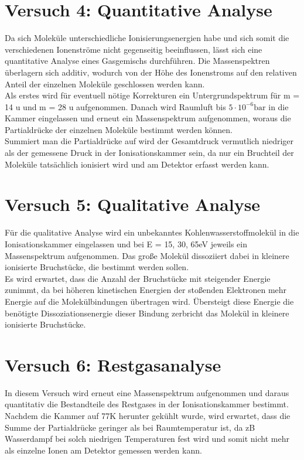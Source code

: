 \section{Versuch 4: Quantitative Analyse}

Da sich Moleküle unterschiedliche Ionisierungsenergien habe und sich somit die verschiedenen Ionenströme nicht gegenseitig beeinflussen, lässt sich eine 
quantitative Analyse eines Gasgemischs durchführen. Die Massenspektren überlagern
sich additiv, wodurch von der Höhe des Ionenstroms auf den relativen Anteil der einzelnen Moleküle geschlossen werden kann.\\
Als erstes wird für eventuell nötige Korrekturen ein Untergrundspektrum für m = 14 u und m = 28 u aufgenommen.
Danach wird Raumluft bis $5\cdot10^{-6} \si{\bar}$ in die Kammer eingelassen und erneut ein Massenspektrum aufgenommen, woraus die Partialdrücke der einzelnen Moleküle bestimmt werden können.\\
Summiert man die Partialdrücke auf wird der Gesamtdruck vermutlich niedriger als der gemessene Druck in der Ionisationskammer sein, da nur ein Bruchteil der Moleküle tatsächlich ionisiert wird und am Detektor erfasst werden kann.

\section{Versuch 5: Qualitative Analyse}

Für die qualitative Analyse wird ein unbekanntes Kohlenwasserstoffmolekül in die Ionisationskammer eingelassen und bei E = {15, 30, 65}\;eV jeweils ein Massenspektrum aufgenommen.
Das große Molekül dissoziiert dabei in kleinere ionisierte Bruchstücke, die bestimmt werden sollen.\\
Es wird erwartet, dass die Anzahl der Bruchstücke mit steigender Energie zunimmt, da bei höheren kinetischen Energien der stoßenden Elektronen mehr Energie auf die Molekülbindungen übertragen wird. 
Übersteigt diese Energie die benötigte Dissoziationsenergie dieser Bindung zerbricht das Molekül in kleinere ionisierte Bruchstücke.

\section{Versuch 6: Restgasanalyse}

In diesem Versuch wird erneut eine Massenspektrum aufgenommen und daraus quantitativ die Bestandteile des Restgases in der Ionisationskammer bestimmt.
Nachdem die Kammer auf 77\;K herunter gekühlt wurde, wird erwartet, dass die Summe der Partialdrücke geringer als bei Raumtemperatur ist, da zB Wasserdampf bei solch niedrigen Temperaturen fest wird und somit nicht mehr als einzelne Ionen am Detektor gemessen werden kann.